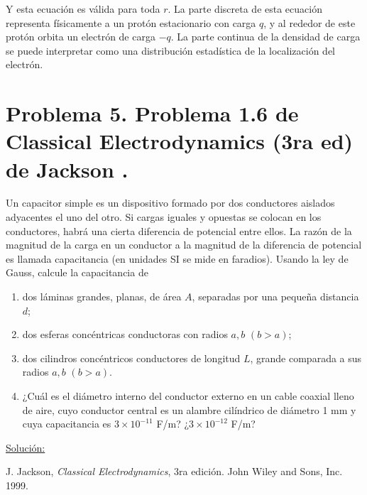 \documentclass[a4paper,10pt]{article}
\numberwithin{equation}{section}
\begin{document}
Y esta ecuación es válida para toda $r$. La parte discreta de esta ecuación
representa físicamente a un  protón estacionario con carga $q$, y al rededor de 
este protón orbita un electrón  de carga $-q$. La parte continua de la densidad 
de carga se puede interpretar como una distribución estadística de la
localización del electrón.

\section{Problema 5. Problema 1.6 de Classical Electrodynamics (3ra ed) de 
Jackson \cite{jackson}.}

Un capacitor simple es un dispositivo formado por dos conductores aislados 
adyacentes el uno del otro. Si cargas iguales y opuestas se colocan en los 
conductores, habrá una cierta diferencia de potencial entre ellos. La razón de 
la magnitud de la carga en un conductor a la magnitud de la diferencia de 
potencial es llamada capacitancia (en unidades SI se mide en faradios). Usando la 
ley de Gauss, calcule la capacitancia de 

\begin{enumerate}[label=\textbf{(\alph*)}]
 \item dos láminas grandes, planas, de área $A$, separadas por una pequeña 
 distancia $d$;
 \item dos esferas concéntricas conductoras con radios $a,b$ $(b > a)$;
 \item dos cilindros concéntricos conductores de longitud $L$, grande comparada 
 a sus radios $a,b$ $(b > a)$.
 \item ¿Cuál es el diámetro interno del conductor externo en un cable coaxial 
 lleno de aire, cuyo conductor central es un alambre cilíndrico de diámetro 
 1 mm y cuya capacitancia es $3\times 10^{-11}$ F/m? ¿$3\times 10^{-12}$ F/m?
\end{enumerate}

\vspace{.3cm}

\underline{Solución:} \vspace{.3cm}

\begin{thebibliography}{10}
J. Jackson, \emph{Classical Electrodynamics}, 3ra edición. John Wiley and Sons, Inc. 
1999.
\end{thebibliography}
\end{document}
